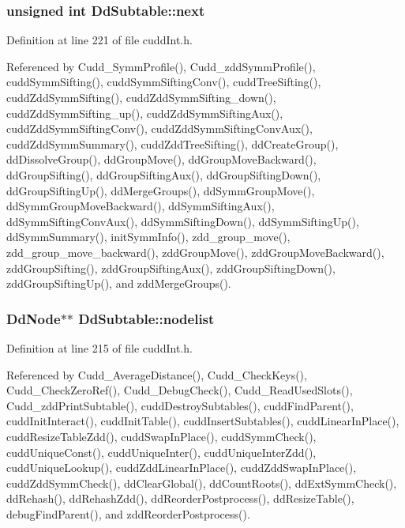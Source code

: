 \subsubsection{\setlength{\rightskip}{0pt plus 5cm}unsigned int \bf{Dd\-Subtable::next}}\label{structDdSubtable_b7d4e44285966307d5683079096d3ab2}




Definition at line 221 of file cudd\-Int.h.

Referenced by Cudd\_\-Symm\-Profile(), Cudd\_\-zdd\-Symm\-Profile(), cudd\-Symm\-Sifting(), cudd\-Symm\-Sifting\-Conv(), cudd\-Tree\-Sifting(), cudd\-Zdd\-Symm\-Sifting(), cudd\-Zdd\-Symm\-Sifting\_\-down(), cudd\-Zdd\-Symm\-Sifting\_\-up(), cudd\-Zdd\-Symm\-Sifting\-Aux(), cudd\-Zdd\-Symm\-Sifting\-Conv(), cudd\-Zdd\-Symm\-Sifting\-Conv\-Aux(), cudd\-Zdd\-Symm\-Summary(), cudd\-Zdd\-Tree\-Sifting(), dd\-Create\-Group(), dd\-Dissolve\-Group(), dd\-Group\-Move(), dd\-Group\-Move\-Backward(), dd\-Group\-Sifting(), dd\-Group\-Sifting\-Aux(), dd\-Group\-Sifting\-Down(), dd\-Group\-Sifting\-Up(), dd\-Merge\-Groups(), dd\-Symm\-Group\-Move(), dd\-Symm\-Group\-Move\-Backward(), dd\-Symm\-Sifting\-Aux(), dd\-Symm\-Sifting\-Conv\-Aux(), dd\-Symm\-Sifting\-Down(), dd\-Symm\-Sifting\-Up(), dd\-Symm\-Summary(), init\-Symm\-Info(), zdd\_\-group\_\-move(), zdd\_\-group\_\-move\_\-backward(), zdd\-Group\-Move(), zdd\-Group\-Move\-Backward(), zdd\-Group\-Sifting(), zdd\-Group\-Sifting\-Aux(), zdd\-Group\-Sifting\-Down(), zdd\-Group\-Sifting\-Up(), and zdd\-Merge\-Groups().
\subsubsection{\setlength{\rightskip}{0pt plus 5cm}\bf{Dd\-Node}$\ast$$\ast$ \bf{Dd\-Subtable::nodelist}}\label{structDdSubtable_1226ea7ecfb6d6b56269cb518ac5e2d7}




Definition at line 215 of file cudd\-Int.h.

Referenced by Cudd\_\-Average\-Distance(), Cudd\_\-Check\-Keys(), Cudd\_\-Check\-Zero\-Ref(), Cudd\_\-Debug\-Check(), Cudd\_\-Read\-Used\-Slots(), Cudd\_\-zdd\-Print\-Subtable(), cudd\-Destroy\-Subtables(), cudd\-Find\-Parent(), cudd\-Init\-Interact(), cudd\-Init\-Table(), cudd\-Insert\-Subtables(), cudd\-Linear\-In\-Place(), cudd\-Resize\-Table\-Zdd(), cudd\-Swap\-In\-Place(), cudd\-Symm\-Check(), cudd\-Unique\-Const(), cudd\-Unique\-Inter(), cudd\-Unique\-Inter\-Zdd(), cudd\-Unique\-Lookup(), cudd\-Zdd\-Linear\-In\-Place(), cudd\-Zdd\-Swap\-In\-Place(), cudd\-Zdd\-Symm\-Check(), dd\-Clear\-Global(), dd\-Count\-Roots(), dd\-Ext\-Symm\-Check(), dd\-Rehash(), dd\-Rehash\-Zdd(), dd\-Reorder\-Postprocess(), dd\-Resize\-Table(), debug\-Find\-Parent(), and zdd\-Reorder\-Postprocess().
